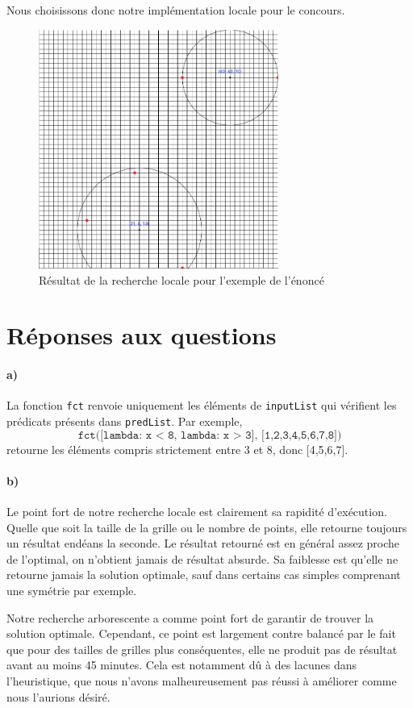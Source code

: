 \documentclass[12pt]{article}
\begin{document}
\vspace{0.5cm}
Nous choisissons donc notre implémentation locale pour le concours.

\begin{figure}[H]
  \centering
  \includegraphics[width = 0.7\textwidth]{50x50}
  \caption{Résultat de la recherche locale pour l'exemple de l'énoncé}
  \label{50x50}
\end{figure}



\section{Réponses aux questions}
\paragraph{a)}
La fonction \texttt{fct} renvoie uniquement les éléments de \texttt{inputList} qui vérifient les prédicats présents dans \texttt{predList}.
Par exemple,
\begin{equation*}
	\texttt{fct([lambda: x < 8, lambda: x > 3], [1,2,3,4,5,6,7,8])}
\end{equation*}
retourne les éléments compris strictement entre 3 et 8, donc [4,5,6,7].


\paragraph{b)}
Le point fort de notre recherche locale est clairement sa rapidité d'exécution. Quelle que soit la taille de la grille ou le nombre de points, elle retourne toujours un résultat endéans la seconde. Le résultat retourné est en général assez proche de l'optimal, on n'obtient jamais de résultat absurde. Sa faiblesse est qu'elle ne retourne jamais la solution optimale, sauf dans certains cas simples comprenant une symétrie par exemple.

Notre recherche arborescente a comme point fort de garantir de trouver la solution optimale. Cependant, ce point est largement contre balancé par le fait que pour des tailles de grilles plus conséquentes, elle ne produit pas de résultat avant au moins 45 minutes. Cela est notamment dû à des lacunes dans l'heuristique, que nous n'avons malheureusement pas réussi à améliorer comme nous l'aurions désiré.
\end{document}
